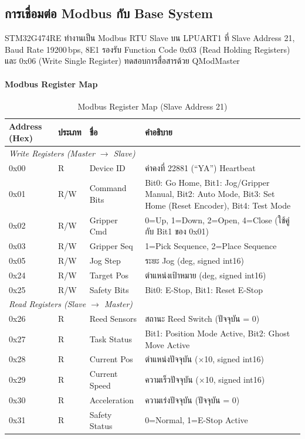 \subsection{การเชื่อมต่อ Modbus กับ Base System}
\label{subsec:modbus_connection}

STM32G474RE ทำงานเป็น Modbus RTU Slave
บน LPUART1 ที่ Slave Address 21,
Baud Rate 19200\,bps, 8E1
รองรับ Function Code 0x03 (Read Holding Registers)
และ 0x06 (Write Single Register)
ทดสอบการสื่อสารด้วย QModMaster

\paragraph{Modbus Register Map}

\begin{table}[H]
  \centering
  \caption{Modbus Register Map (Slave Address 21)}
  \label{tab:modbus_map}
  \begin{tabular}{lllp{5.5cm}}
    \toprule
    Address (Hex) & ประเภท & ชื่อ & คำอธิบาย \\
    \midrule
    \multicolumn{4}{l}{\textit{Write Registers (Master $\rightarrow$ Slave)}} \\
    \midrule
    0x00 & R    & Device ID    & ค่าคงที่ 22881 (``YA'') Heartbeat \\
    0x01 & R/W  & Command Bits &
      Bit0: Go Home,
      Bit1: Jog/Gripper Manual,
      Bit2: Auto Mode,
      Bit3: Set Home (Reset Encoder),
      Bit4: Test Mode \\
    0x02 & R/W  & Gripper Cmd  &
      0=Up, 1=Down, 2=Open, 4=Close
      (ใช้คู่กับ Bit1 ของ 0x01) \\
    0x03 & R/W  & Gripper Seq  & 1=Pick Sequence, 2=Place Sequence \\
    0x05 & R/W  & Jog Step     & ระยะ Jog (deg, signed int16) \\
    0x24 & R/W  & Target Pos   & ตำแหน่งเป้าหมาย (deg, signed int16) \\
    0x25 & R/W  & Safety Bits  & Bit0: E-Stop, Bit1: Reset E-Stop \\
    \midrule
    \multicolumn{4}{l}{\textit{Read Registers (Slave $\rightarrow$ Master)}} \\
    \midrule
    0x26 & R    & Reed Sensors & สถานะ Reed Switch (ปัจจุบัน = 0) \\
    0x27 & R    & Task Status  &
      Bit1: Position Mode Active,
      Bit2: Ghost Move Active \\
    0x28 & R    & Current Pos  & ตำแหน่งปัจจุบัน ($\times$10, signed int16) \\
    0x29 & R    & Current Speed& ความเร็วปัจจุบัน ($\times$10, signed int16) \\
    0x30 & R    & Acceleration & ความเร่งปัจจุบัน (ปัจจุบัน = 0) \\
    0x31 & R    & Safety Status& 0=Normal, 1=E-Stop Active \\
    \bottomrule
  \end{tabular}
\end{table}

